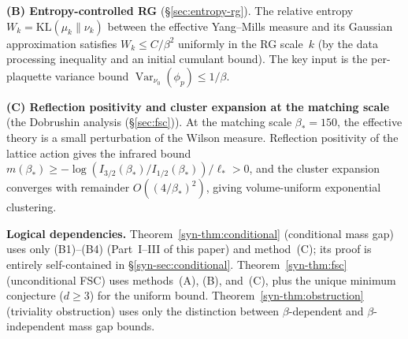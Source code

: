 \documentclass[11pt]{article}
\theoremstyle{definition}
\newcommand{\Var}{\operatorname{Var}}
\newcommand{\KL}{\mathrm{KL}}
\begin{document}
\smallskip
\noindent\textbf{(B) Entropy-controlled RG}
(\S\ref{sec:entropy-rg}).
The relative entropy $W_k = \KL(\mu_k \| \nu_k)$ between
the effective Yang--Mills measure and its Gaussian
approximation satisfies $W_k \leq C/\beta^2$ uniformly
in the RG scale~$k$ (by the data processing inequality
and an initial cumulant bound).
The key input is the per-plaquette variance bound
$\Var_{\nu_0}(\phi_p) \leq 1/\beta$.

\smallskip
\noindent\textbf{(C) Reflection positivity and cluster expansion
at the matching scale}
(the Dobrushin analysis (\S\ref{sec:fsc})).
At the matching scale $\beta_* = 150$, the effective theory
is a small perturbation of the Wilson measure.  Reflection
positivity of the lattice action gives the infrared bound
$m(\beta_*) \geq -\log(I_{3/2}(\beta_*)/I_{1/2}(\beta_*))/\ell_*
> 0$,
and the cluster expansion converges with remainder
$O((4/\beta_*)^2)$, giving volume-uniform exponential
clustering.

\smallskip
\noindent\textbf{Logical dependencies.}
Theorem~\ref{syn-thm:conditional} (conditional mass gap) uses
only (B1)--(B4) (Part~I--III of this paper) and method~(C); its proof
is entirely self-contained in \S\ref{syn-sec:conditional}.
Theorem~\ref{syn-thm:fsc} (unconditional FSC) uses methods~(A),
(B), and~(C), plus the unique minimum conjecture ($d \geq 3$)
for the uniform bound.
Theorem~\ref{syn-thm:obstruction} (triviality obstruction) uses
only the distinction between $\beta$-dependent and
$\beta$-independent mass gap bounds.
\end{document}
